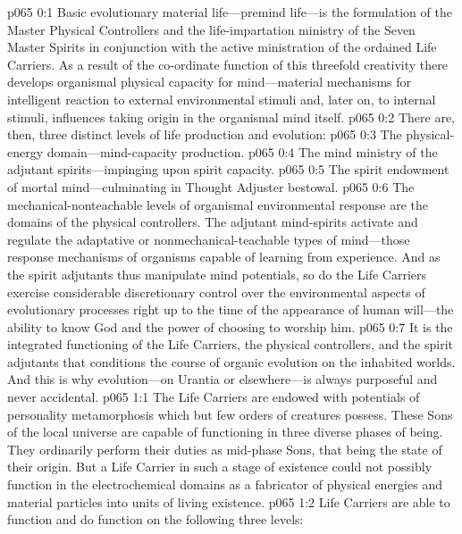 \author{Life Carrier}
\vs p065 0:1 Basic evolutionary material life---premind life---is the formulation of the Master Physical Controllers and the life\hyp{}impartation ministry of the Seven Master Spirits in conjunction with the active ministration of the ordained Life Carriers. As a result of the co\hyp{}ordinate function of this threefold creativity there develops organismal physical capacity for mind---material mechanisms for intelligent reaction to external environmental stimuli and, later on, to internal stimuli, influences taking origin in the organismal mind itself.\plusone
\pc \vs p065 0:2 There are, then, three distinct levels of life production and evolution:
\pc \vs p065 0:3 \bibnobreakspace The physical\hyp{}energy domain---mind\hyp{}capacity production.
\vs p065 0:4 \bibnobreakspace The mind ministry of the adjutant spirits---impinging upon spirit capacity.\plusone
\vs p065 0:5 \bibnobreakspace The spirit endowment of mortal mind---culminating in Thought Adjuster bestowal.
\pc \vs p065 0:6 The mechanical\hyp{}nonteachable levels of organismal environmental response are the domains of the physical controllers. The adjutant mind\hyp{}spirits activate and regulate the adaptative or nonmechanical\hyp{}teachable types of mind---those response mechanisms of organisms capable of learning from experience. And as the spirit adjutants thus manipulate mind potentials, so do the Life Carriers exercise considerable discretionary control over the environmental aspects of evolutionary processes right up to the time of the appearance of human will---the ability to know God and the power of choosing to worship him.
\vs p065 0:7 It is the integrated functioning of the Life Carriers, the physical controllers, and the spirit adjutants that conditions the course of organic evolution on the inhabited worlds. And this is why evolution---on Urantia or elsewhere---is always purposeful and never accidental.
\vs p065 1:1 The Life Carriers are endowed with potentials of personality metamorphosis which but few orders of creatures possess. These Sons of the local universe are capable of functioning in three diverse phases of being. They ordinarily perform their duties as mid\hyp{}phase Sons, that being the state of their origin. But a Life Carrier in such a stage of existence could not possibly function in the electrochemical domains as a fabricator of physical energies and material particles into units of living existence.
\vs p065 1:2 Life Carriers are able to function and do function on the following three levels:
